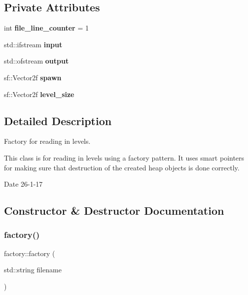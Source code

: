 \subsection*{Private Attributes}
\begin{DoxyCompactItemize}
\item 
\mbox{\label{classfactory_af33b0e5fcc396c359d30a00afacb819b}} 
int {\bfseries file\+\_\+line\+\_\+counter} = 1
\item 
\mbox{\label{classfactory_a9a874663e858e01c8ff372c070b8c19e}} 
std\+::ifstream {\bfseries input}
\item 
\mbox{\label{classfactory_a0454b8bf0f45196f436ddf3febc422f3}} 
std\+::ofstream {\bfseries output}
\item 
\mbox{\label{classfactory_a891028263226aa493299e51f767211a1}} 
sf\+::\+Vector2f {\bfseries spawn}
\item 
\mbox{\label{classfactory_a29d1328317de4563aefb5c2f32f63424}} 
sf\+::\+Vector2f {\bfseries level\+\_\+size}
\end{DoxyCompactItemize}


\subsection{Detailed Description}
Factory for reading in levels. 

This class is for reading in levels using a factory pattern. It uses smart pointers for making sure that destruction of the created heap objects is done correctly. \begin{DoxyDate}{Date}
26-\/1-\/17 
\end{DoxyDate}


\subsection{Constructor \& Destructor Documentation}
\mbox{\label{classfactory_af422815046ef8b9e95a4d8cb747fc43f}} 
\subsubsection{\texorpdfstring{factory()}{factory()}}
{\footnotesize\ttfamily factory\+::factory (\begin{DoxyParamCaption}\item[{std\+::string}]{filename }\end{DoxyParamCaption})}



